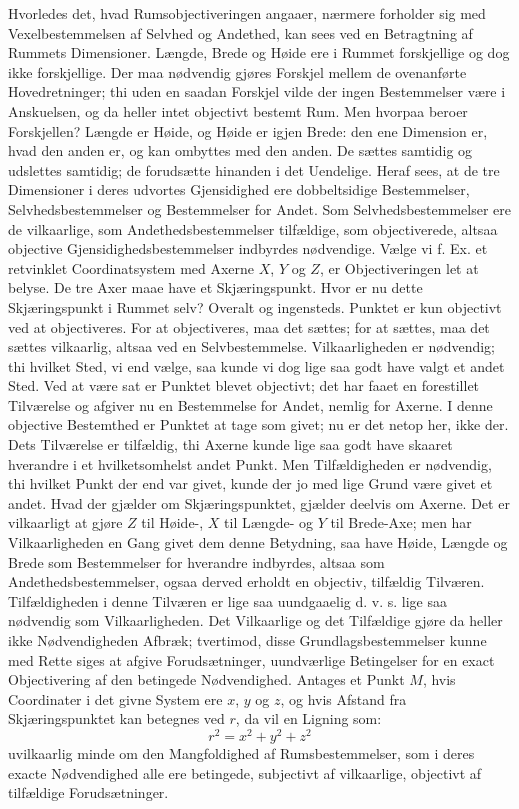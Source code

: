 \documentclass[12pt,a4paper]{book}
\begin{document}
Hvorledes det, hvad Rumsobjectiveringen angaaer, nærmere forholder sig
med Vexelbestemmelsen af Selvhed og Andethed, kan sees ved en
Betragtning af Rummets Dimensioner. Længde, Brede og Høide ere i
Rummet forskjellige og dog ikke forskjellige. Der maa nødvendig gjøres
Forskjel mellem de ovenanførte Hovedretninger; thi uden en saadan
Forskjel vilde der ingen Bestemmelser være i Anskuelsen, og da heller
intet objectivt bestemt Rum. Men hvorpaa beroer Forskjellen? Længde er
Høide, og Høide er igjen Brede: den ene Dimension er, hvad den anden
er, og kan ombyttes med den anden. De sættes samtidig og udslettes
samtidig; de forudsætte hinanden i det Uendelige. Heraf sees, at de tre
Dimensioner i deres udvortes Gjensidighed ere dobbeltsidige
Bestemmelser, Selvhedsbestemmelser og Bestemmelser for Andet. Som
Selvhedsbestemmelser ere de vilkaarlige, som Andethedsbestemmelser
tilfældige, som objectiverede, altsaa objective
Gjensidighedsbestemmelser indbyrdes nødvendige. Vælge vi f. Ex. et
retvinklet Coordinatsystem med Axerne $X$, $Y$ og $Z$, er
Objectiveringen let at belyse. De tre Axer maae have et
Skjæringspunkt. Hvor er nu dette Skjæringspunkt i Rummet selv? Overalt
og ingensteds. Punktet er kun objectivt ved at objectiveres. For at
objectiveres, maa det sættes; for at sættes, maa det sættes vilkaarlig,
altsaa ved en Selvbestemmelse. Vilkaarligheden er nødvendig; thi
hvilket Sted, vi end vælge, saa kunde vi dog lige saa godt have valgt
et andet Sted. Ved at være sat er Punktet blevet objectivt; det har
faaet en forestillet Tilværelse og afgiver nu en Bestemmelse for Andet,
nemlig for Axerne. I denne objective Bestemthed er Punktet at tage som
givet; nu er det netop her, ikke der.
Dets Tilværelse er tilfældig, thi Axerne kunde lige saa godt have
skaaret hverandre i et hvilketsomhelst andet Punkt. Men Tilfældigheden
er nødvendig, thi hvilket Punkt der end var givet, kunde der jo med
lige Grund være givet et andet. Hvad der gjælder om Skjæringspunktet,
gjælder deelvis om Axerne. Det er vilkaarligt at gjøre $Z$ til
Høide-, $X$ til Længde- og $Y$ til Brede-Axe; men har Vilkaarligheden
en Gang givet dem denne Betydning, saa have Høide, Længde og Brede som
Bestemmelser for hverandre indbyrdes, altsaa som
Andethedsbestemmelser, ogsaa derved erholdt en objectiv, tilfældig
Tilværen. Tilfældigheden i denne Tilværen er lige saa uundgaaelig
d. v. s. lige saa nødvendig som Vilkaarligheden. Det Vilkaarlige og
det Tilfældige gjøre da heller ikke Nødvendigheden Afbræk; tvertimod,
disse Grundlagsbestemmelser kunne med Rette siges at afgive
Forudsætninger, uundværlige Betingelser for en exact Objectivering af
den betingede Nødvendighed. Antages et Punkt $M$, hvis Coordinater i
det givne System ere $x$, $y$ og $z$, og hvis Afstand fra
Skjæringspunktet kan betegnes ved $r$, da vil en Ligning som:
\[
  r^2 = x^2 + y^2 + z^2
\]
uvilkaarlig minde om den Mangfoldighed af Rumsbestemmelser, som i
deres exacte Nødvendighed alle ere betingede, subjectivt af
vilkaarlige, objectivt af tilfældige Forudsætninger.
\end{document}
